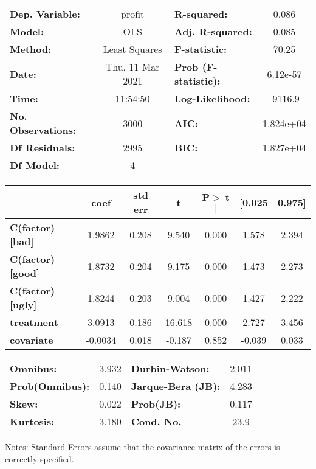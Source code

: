 \begin{center}
\begin{tabular}{lclc}
\toprule
\textbf{Dep. Variable:}    &      profit      & \textbf{  R-squared:         } &     0.086   \\
\textbf{Model:}            &       OLS        & \textbf{  Adj. R-squared:    } &     0.085   \\
\textbf{Method:}           &  Least Squares   & \textbf{  F-statistic:       } &     70.25   \\
\textbf{Date:}             & Thu, 11 Mar 2021 & \textbf{  Prob (F-statistic):} &  6.12e-57   \\
\textbf{Time:}             &     11:54:50     & \textbf{  Log-Likelihood:    } &   -9116.9   \\
\textbf{No. Observations:} &        3000      & \textbf{  AIC:               } & 1.824e+04   \\
\textbf{Df Residuals:}     &        2995      & \textbf{  BIC:               } & 1.827e+04   \\
\textbf{Df Model:}         &           4      & \textbf{                     } &             \\
\bottomrule
\end{tabular}
\begin{tabular}{lcccccc}
                         & \textbf{coef} & \textbf{std err} & \textbf{t} & \textbf{P$> |$t$|$} & \textbf{[0.025} & \textbf{0.975]}  \\
\midrule
\textbf{C(factor)[bad]}  &       1.9862  &        0.208     &     9.540  &         0.000        &        1.578    &        2.394     \\
\textbf{C(factor)[good]} &       1.8732  &        0.204     &     9.175  &         0.000        &        1.473    &        2.273     \\
\textbf{C(factor)[ugly]} &       1.8244  &        0.203     &     9.004  &         0.000        &        1.427    &        2.222     \\
\textbf{treatment}       &       3.0913  &        0.186     &    16.618  &         0.000        &        2.727    &        3.456     \\
\textbf{covariate}       &      -0.0034  &        0.018     &    -0.187  &         0.852        &       -0.039    &        0.033     \\
\bottomrule
\end{tabular}
\begin{tabular}{lclc}
\textbf{Omnibus:}       &  3.932 & \textbf{  Durbin-Watson:     } &    2.011  \\
\textbf{Prob(Omnibus):} &  0.140 & \textbf{  Jarque-Bera (JB):  } &    4.283  \\
\textbf{Skew:}          &  0.022 & \textbf{  Prob(JB):          } &    0.117  \\
\textbf{Kurtosis:}      &  3.180 & \textbf{  Cond. No.          } &     23.9  \\
\bottomrule
\end{tabular}
\end{center}

Notes: \newline
 [1] Standard Errors assume that the covariance matrix of the errors is correctly specified.